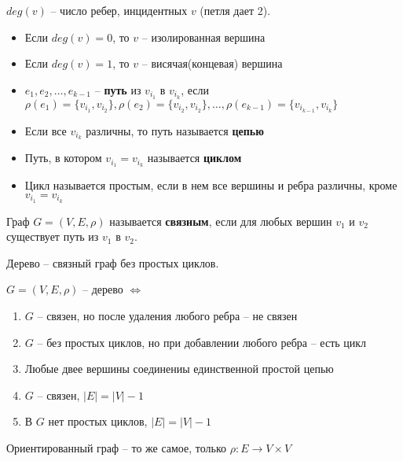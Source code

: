 \begin{df}
	$deg(v)$ -- число ребер, инцидентных $v$ (петля дает 2).
\end{df}

\begin{itemize}
	\item Если $deg(v) = 0$, то $v$ -- изолированная вершина
	\item Если $deg(v) = 1$, то $v$ -- висячая(концевая) вершина
\end{itemize}

\begin{df}
 	\begin{itemize}
 		\item $e_1, e_2, \ldots, e_{k-1}$ -- {\bf путь}	 из $v_{i_1}$ в $v_{i_k}$, если $\rho(e_1) = \{v_{i_1}, v_{i_2}\}, \rho(e_2) = \{v_{i_2}, v_{i_2}\} , \ldots, \rho(e_{k-1}) = \{v_{i_{k-1}}, v_{i_k}\}$
 		\item Если все $v_{i_k}$ различны, то путь называется {\bf цепью}
 		\item Путь, в котором $v_{i_1} = v_{i_k}$ называется {\bf циклом}
 		\item Цикл называется простым, если в нем все вершины и ребра различны, кроме $v_{i_1} = v_{i_k}$
 	\end{itemize}
\end{df}

\begin{df}
	Граф $G = (V, E, \rho)$ называется {\bf связным}, если для любых вершин $v_1$ и $v_2$ существует путь из $v_1$ в $v_2$.

	Дерево -- связный граф без простых циклов.
\end{df}

\begin{exer}
	$G = (V, E, \rho)$ -- дерево $\Longleftrightarrow$
	\begin{enumerate}
		\item $G$ -- связен, но после удаления любого ребра -- не связен
		\item $G$ -- без простых циклов, но при добавлении любого ребра -- есть цикл
		\item Любые двее вершины соединениы единственной простой цепью
		\item $G$ -- связен, $|E| = |V| - 1$
		\item В $G$ нет простых циклов, $|E| = |V| - 1$
	\end{enumerate}
\end{exer}

\begin{df}
	Ориентированный граф -- то же самое, только $\rho: E \rightarrow V \times V$
\end{df}


